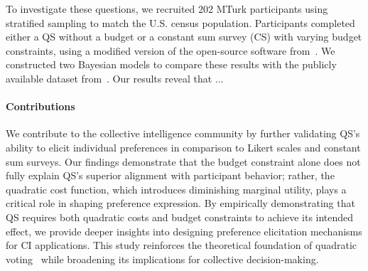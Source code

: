 
To investigate these questions, we recruited 202 MTurk participants using stratified sampling to match the U.S. census population. Participants completed either a QS without a budget or a constant sum survey (CS) with varying budget constraints, using a modified version of the open-source software from~\citet{chengCanShowWhat2021}. We constructed two Bayesian models to compare these results with the publicly available dataset from~\citet{illinoisdatabankIDB-1928463}. Our results reveal that ...


\paragraph{Contributions}
We contribute to the collective intelligence community by further validating QS’s ability to elicit individual preferences in comparison to Likert scales and constant sum surveys. Our findings demonstrate that the budget constraint alone does not fully explain QS’s superior alignment with participant behavior; rather, the quadratic cost function, which introduces diminishing marginal utility, plays a critical role in shaping preference expression. By empirically demonstrating that QS requires both quadratic costs and budget constraints to achieve its intended effect, we provide deeper insights into designing preference elicitation mechanisms for CI applications. This study reinforces the theoretical foundation of quadratic voting~\cite{lalley2016quadratic} while broadening its implications for collective decision-making.

